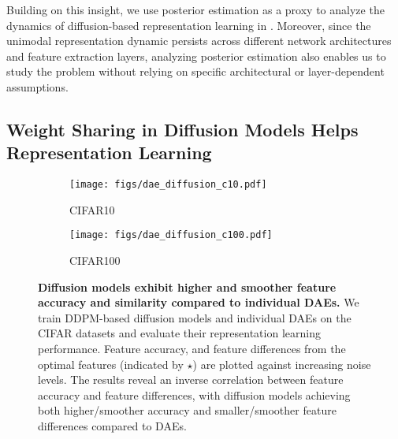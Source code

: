 {Building on this insight, we use posterior estimation as a proxy to analyze the dynamics of diffusion-based representation learning in . Moreover, since the unimodal representation dynamic persists across different network architectures and feature extraction layers, analyzing posterior estimation also enables us to study the problem without relying on specific architectural or layer-dependent assumptions.


\subsection{Weight Sharing in Diffusion Models Helps Representation Learning}\label{subsec:weight_share}

\begin{figure}[t]
    \begin{center}
    \begin{subfigure}{0.48\textwidth}
    \texttt{[image: figs/dae\_diffusion\_c10.pdf]}
    \caption{CIFAR10} 
    \end{subfigure} \quad %
    \begin{subfigure}{0.48\textwidth}
    \texttt{[image: figs/dae\_diffusion\_c100.pdf]}
    \caption{CIFAR100} 
    \end{subfigure}
    \end{center}
    \vspace{-0.1in}
\caption{\textbf{Diffusion models exhibit higher and smoother feature accuracy and similarity compared to individual DAEs.} We train DDPM-based diffusion models and individual DAEs on the CIFAR datasets and evaluate their representation learning performance. Feature accuracy, and feature differences from the optimal features (indicated by {\color{cyan} $\star$}) are plotted against increasing noise levels. The results reveal an inverse correlation between feature accuracy and feature differences, with diffusion models achieving both higher/smoother accuracy and smaller/smoother feature differences compared to DAEs.}
\label{fig:dae_diffusion}
\end{figure}


}
